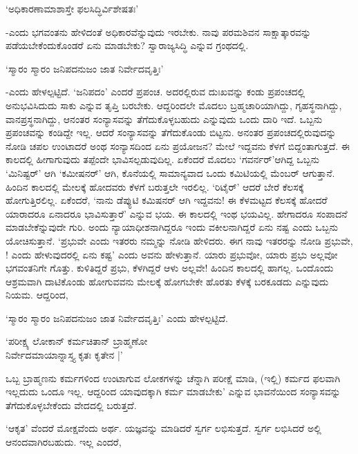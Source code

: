 \begin{shloka}
`ಅಧಿಕಾರಣಾಮಾಶಾಸ್ತೇ ಫಲಸಿದ್ಧಿರ್ವಿಶೇಷತಃ'
\end{shloka}

-ಎಂದು ಭಗವಂತನು ಹೇಳಿದಂತೆ ಅಧಿಕಾರವೆನ್ನುವುದು ಇರಬೇಕು. ನಾವು ಪರಮಶಿವನ ಸಾಕ್ಷಾತ್ಕಾರವನ್ನು ಪಡೆಯಬೇಕೆಂದುಕೊಂಡರೆ ಏನು ಮಾಡಬೇಕು? ಸ್ವಾರಾಜ್ಯಸಿದ್ಧಿ ಎನ್ನುವ ಗ್ರಂಥದಲ್ಲಿ.

\begin{shloka}
`ಸ್ಮಾರಂ ಸ್ಮಾರಂ ಜನಿಪದನುಜಂ ಜಾತ ನಿರ್ವೇದವೃತ್ತಿಃ'
\end{shloka}

-ಎಂದು ಹೇಳಲ್ಪಟ್ಟಿದೆ. `ಜನಿಪದಂ' ಎಂದರೆ ಪ್ರಪಂಚ. ಅದರಲ್ಲಿರುವ ದುಃಖವನ್ನು ಕಂಡು ಪ್ರಪಂಚದಲ್ಲಿ ಅನುಭವಿಸಿದುದು ಸಾಕು ಎನ್ನುವ ತೃಪ್ತಿ ಬರಬೇಕು. ಆದ್ದರಿಂದಲೇ ಮೊದಲು ಬ್ರಹ್ಮಚಾರಿಯಾಗಿದ್ದು, ಗೃಹಸ್ಥನಾಗಿದ್ದು, ವಾನಪ್ರಸ್ಥನಾಗಿದ್ದು, ಆನಂತರ ಸಂನ್ಯಾಸವನ್ನು ತೆಗೆದುಕೊಳ್ಳಬಹುದು ಎನ್ನುವುದು ಒಂದು ದಾರಿ ಇದೆ. ಒಬ್ಬನು ಪ್ರಪಂಚವನ್ನು ಕಂಡಿದ್ದೇ ಇಲ್ಲ. ಆದರೆ ಸಂನ್ಯಾಸವನ್ನು ತೆಗೆದುಕೊಂಡು ಬಿಟ್ಟನು. ಅನಂತರ ಪ್ರಪಂಚದಲ್ಲಿರುವುದನ್ನು ನೋಡಿ ಚಪಲ ಉಂಟಾದರೆ ಅಂಥ ಸಂನ್ಯಾಸದಿಂದ ಏನು ಪ್ರಯೋಜನ? ಮೇಲೆ ಇದ್ದವನು ಕೆಳಗೆ ಬಿದ್ದಂತಾಗುತ್ತದೆ. ಈ ಕಾಲದಲ್ಲಿ ಹೀಗಾಗುವುದು ತಪ್ಪೆಂದೇ ಭಾವಿಸಲ್ಪಡುವುದಿಲ್ಲ. ಏಕೆಂದರೆ ಮೊದಲು `ಗವರ್ನರ್'ಆಗಿದ್ದ ಒಬ್ಬನು `ಮಿನಿಷ್ಟರ್' ಆಗಿ `ಕಮೀಷನರ್' ಆಗಿ, ಕೊನೆಯಲ್ಲಿ ಸಾಮಾನ್ಯವಾದ ಒಂದು ಕಮಿಟಿಯಲ್ಲಿ ಮೆಂಬರ್ ಆಗುತ್ತಾನೆ. ಹಿಂದಿನ ಕಾಲದಲ್ಲಿ ಮೇಲಕ್ಕೆ ಹೋದವರು ಕೆಳಗೆ ಬರುತ್ತಲೇ ಇರಲಿಲ್ಲ. `ರಿಟೈರ್' ಆದರೆ ಬೇರೆ ಕೆಲಸಕ್ಕೆ ಹೋಗುತ್ತಿರಲಿಲ್ಲ. ಏಕೆಂದರೆ, `ನಾನು ಡೆಪ್ಯುಟಿ ಕಮಿಷನರ್ ಆಗಿ ಇದ್ದವನು! ಈ ಕೆಳಮಟ್ಟದ ಕೆಲಸಕ್ಕೆ ಹೋದರೆ ಯಾರಾದರೂ ಏನಾದರೂ ಭಾವಿಸುತ್ತಾರೆ' ಎನ್ನುವ ಭಯ. ಈ ಕಾಲದಲ್ಲಿ ಇಂಥ ಭಯವಿಲ್ಲ. ಹೇಗಾದರೂ ಸಂಪಾದನೆ ಮಾಡಬೇಕೆನ್ನುವುದೇ ಗುರಿ. ಅಂದು ನ್ಯಾಯಾಧೀಶನಾಗಿದ್ದರೂ ಇಂದು ವಕೀಲನಾಗಿದ್ದರೆ ಏನು ನಷ್ಟ ಎಂದು ಒಬ್ಬನು ಯೋಚಿಸುತ್ತಾನೆ. `ಪ್ರಭುವೇ ಎಂದು ಇತರರು ನಮ್ಮನ್ನು ನೋಡಿ ಹೇಳಿದರು. ಈಗ ನಾವು ಇತರರನ್ನು ನೋಡಿ ಪ್ರಭುವೇ, ! ಎಂದು ಹೇಳುವುದರಲ್ಲಿ ಏನು ಕಷ್ಟ' ಎಂದು ಅವನು ಹೇಳುತ್ತಾನೆ. ಯಾರು ಪ್ರಭುವೋ, ಯಾರು ಪ್ರಭು ಅಲ್ಲವೋ ಭಗವಂತನಿಗೇ ಗೊತ್ತು. ಕುಳಿತಿದ್ದರೆ ಪ್ರಭು, ಕೆಳಗಿದ್ದರೆ ಆಳು ಅಲ್ಲವೇ! ಹಿಂದಿನ ಕಾಲದಲ್ಲಿ ಹಾಗಲ್ಲ. ಒಂದೊಂದು ಆಶ್ರಮವಾಗಿ ದಾಟಿಕೊಂಡು ಹೋಗುವವನು ಮೇಲಕ್ಕೆ ಹೋಗಬೇಕೇ ಹೊರತು ಕೆಳಕ್ಕೆ ಬರಕೂಡದು ಎನ್ನುವುದು ನಿಯಮ. ಆದ್ದರಿಂದ, 

`ಸ್ಮಾರಂ ಸ್ಮಾರಂ ಜನಿಪದನುಜಂ ಜಾತ ನಿರ್ವೇದವೃತ್ತಿಃ' ಎಂದು ಹೇಳಲ್ಪಟ್ಟಿದೆ.

\begin{shloka}
`ಪರೀಕ್ಷ್ಯ ಲೋಕಾನ್ ಕರ್ಮಚಿತಾನ್ ಬ್ರಾಹ್ಮಣೋ\\
ನಿರ್ವೇದಮಾಯಾನ್ನಾಸ್ತ್ಯ ಕೃತಃ ಕೃತೇನ |'
\end{shloka}

ಒಬ್ಬ ಬ್ರಾಹ್ಮಣನು ಕರ್ಮಗಳಿಂದ ಉಂಟಾಗುವ ಲೋಕಗಳನ್ನು ಚೆನ್ನಾಗಿ ಪರೀಕ್ಷೆ ಮಾಡಿ, (ಇಲ್ಲಿ) ಕರ್ಮದ ಫಲವಾಗಿ ಇಲ್ಲದುದು ಒಂದೂ ಇಲ್ಲ. ಆದ್ದರಿಂದ ಯಾವುದಕ್ಕಾಗಿ ಕರ್ಮ ಮಾಡಬೇಕು' ಎನ್ನುವ ಭಾವನೆಯಿಂದ ಸಂನ್ಯಾಸವನ್ನು ತೆಗೆದುಕೊಳ್ಳಬೇಕೆಂದು ವೇದದಲ್ಲಿ ಬರುತ್ತದೆ.

`ಆಕೃತ' ವೆಂದರೆ ಮೋಕ್ಷವೆಂದು ಅರ್ಥ. ಯಜ್ಞವನ್ನು ಮಾಡಿದರೆ ಸ್ವರ್ಗ ಲಭಿಸುತ್ತದೆ. ಸ್ವರ್ಗ ಲಭಿಸಿದರೆ ಅಲ್ಲಿ ಆನಂದವಾಗಿರಬಹುದು. ಇಲ್ಲ ಎಂದರೆ,

